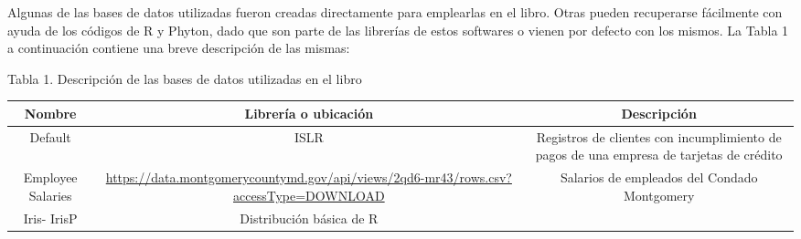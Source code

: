 \documentclass[12pt,]{krantz}
\begin{document}
Algunas de las bases de datos utilizadas fueron creadas directamente para emplearlas en el libro. Otras pueden recuperarse fácilmente con ayuda de los códigos de R y Phyton, dado que son parte de las librerías de estos softwares o vienen por defecto con los mismos. La Tabla 1 a continuación contiene una breve descripción de las mismas:

Tabla 1. Descripción de las bases de datos utilizadas en el libro

\begin{longtable}[]{@{}ccc@{}}
\toprule
\begin{minipage}[b]{0.07\columnwidth}\centering
Nombre\strut
\end{minipage} & \begin{minipage}[b]{0.32\columnwidth}\centering
Librería o ubicación\strut
\end{minipage} & \begin{minipage}[b]{0.52\columnwidth}\centering
Descripción\strut
\end{minipage}\tabularnewline
\midrule
\endhead
\begin{minipage}[t]{0.07\columnwidth}\centering
Default\strut
\end{minipage} & \begin{minipage}[t]{0.32\columnwidth}\centering
ISLR\strut
\end{minipage} & \begin{minipage}[t]{0.52\columnwidth}\centering
Registros de clientes con incumplimiento de pagos de una empresa de tarjetas de crédito\strut
\end{minipage}\tabularnewline
\begin{minipage}[t]{0.07\columnwidth}\centering
Employee Salaries\strut
\end{minipage} & \begin{minipage}[t]{0.32\columnwidth}\centering
\url{https://data.montgomerycountymd.gov/api/views/2qd6-mr43/rows.csv?accessType=DOWNLOAD}\strut
\end{minipage} & \begin{minipage}[t]{0.52\columnwidth}\centering
Salarios de empleados del Condado Montgomery\strut
\end{minipage}\tabularnewline
\begin{minipage}[t]{0.07\columnwidth}\centering
Iris- IrisP\strut
\end{minipage} & \begin{minipage}[t]{0.32\columnwidth}\centering
Distribución básica de R\strut
\end{minipage} & \begin{minipage}[t]{0.52\columnwidth}\centering

\end{minipage}
\end{longtable}
\end{document}
